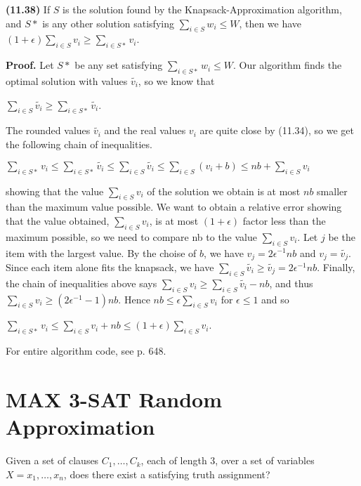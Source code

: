 \documentclass{proc}
\begin{document}
\begin{mdframed}
    \textbf{(11.38)} If $S$ is the solution found by the Knapsack-Approximation algorithm, and $S*$ is any other solution satisfying $\sum_{i \in S} w_i \le W$, then we have $(1 + \epsilon) \sum_{i \in S} v_i \ge \sum_{i \in S*} v_i$.
    
    \textbf{Proof.} Let $S*$ be any set satisfying $\sum_{i \in S*} w_i \le W$. Our algorithm finds the optimal solution with values $\tilde{v_i}$, so we know that
    
    $\sum_{i \in S} \tilde{v_i} \ge \sum_{i \in S*} \tilde{v_i}$.
    
    The rounded values $\tilde{v_i}$ and the real values $v_i$ are quite close by (11.34), so we get the following chain of inequalities.
    
    $\sum_{i \in S*} v_i \le \sum_{i \in S*} \tilde{v_i} \le \sum_{i \in S} \tilde{v_i} \le \sum_{i \in S} (v_i + b) \le nb + \sum_{i \in S} v_i $
    
    showing that the value $\sum_{i \in S} v_i$ of the solution we obtain is at most $nb$ smaller than the maximum value possible. We want to obtain a relative error showing that the value obtained, $\sum_{i \in S} v_i$, is at most $(1 + \epsilon)$ factor less than the maximum possible, so we need to compare nb to the value $\sum_{i \in S} v_i$.
    Let $j$ be the item with the largest value. By the choise of $b$, we have $v_j = 2\epsilon^{-1}nb$ and $v_j = \tilde{v_j}$. Since each item alone fits the knapsack, we have $\sum_{i \in S} \tilde{v_i} \ge \tilde{v_j} = 2\epsilon^{-1}nb$. Finally, the chain of inequalities above says $\sum_{i \in S} v_i \ge \sum_{i \in S} \tilde{v_i} - nb$, and thus $\sum_{i \in S} v_i \ge (2\epsilon^{-1} - 1)nb$. Hence $nb \le \epsilon \sum_{i \in S} v_i$ for $\epsilon \le 1$ and so
    
    $\sum_{i \in S*} v_i \le \sum_{i \in S} v_i + nb \le (1 + \epsilon) \sum_{i \in S} v_i$.
\end{mdframed}

For entire algorithm code, see p. 648.

\section{MAX 3-SAT Random Approximation}

Given a set of clauses $C_1, \ldots, C_k$, each of length 3, over a set of variables $X = {x_1, \ldots, x_n}$, does there exist a satisfying truth assignment?
\end{document}

